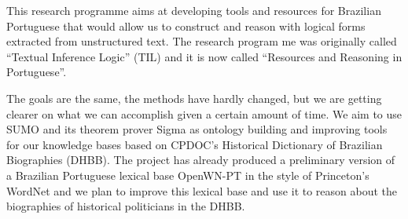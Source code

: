 This research programme aims at developing tools and resources for
Brazilian Portuguese that would allow us to construct and reason with
logical forms extracted from unstructured text. The research program
me was originally called ``Textual Inference Logic'' (TIL) and it is
now called ``Resources and Reasoning in Portuguese''.

The goals are the same, the methods have hardly changed, but we are
getting clearer on what we can accomplish given a certain amount of
time. We aim to use SUMO and its theorem prover Sigma as ontology
building and improving tools for our knowledge bases based on CPDOC's
Historical Dictionary of Brazilian Biographies (DHBB). The project has
already produced a preliminary version of a Brazilian Portuguese
lexical base OpenWN-PT in the style of Princeton's WordNet and we plan
to improve this lexical base and use it to reason about the
biographies of historical politicians in the DHBB.





 

